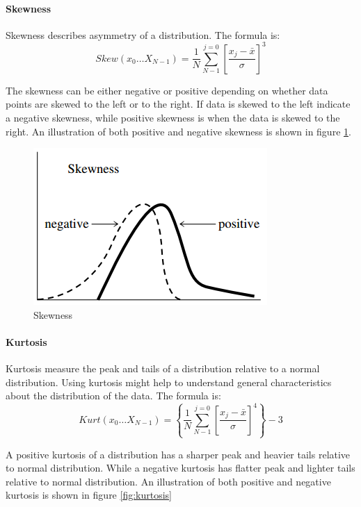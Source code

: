 \documentclass[USenglish]{ifimaster}  %
\begin{document}
\paragraph{Skewness} 
Skewness describes asymmetry of a distribution. The formula is\cite{Press:2007:NRE:1403886}:
	\begin{equation}
	Skew(x_0\dotsc X_{N-1})  =  \frac{1}{N}\sum_{N-1}^{j=0}\left [ \frac{x_j-\bar{x}}{\sigma} \right ]^3
	\label{eq:skew}
	\end{equation}
	
The skewness can be either negative or positive depending on whether data points are skewed to the left or to the right. If data is skewed to the left indicate a negative skewness, while positive skewness is when the data is skewed to the right. An illustration of both positive and negative skewness is shown in figure \ref{fig:skew}.
	
	\begin{figure}[h]
		\centering
		\includegraphics[scale=0.8]{Figures/Skewness}
		\caption{Skewness}
		\label{fig:skew}
	\end{figure}
	
	\FloatBarrier
	
\paragraph{Kurtosis}
Kurtosis measure the peak and tails of a distribution relative to a normal distribution. Using kurtosis might help to understand general characteristics about the distribution of the data. The formula is\cite{Press:2007:NRE:1403886}:
	\begin{equation}
	Kurt(x_0\dotsc X_{N-1}) = \left \{ \frac{1}{N}\sum_{N-1}^{j=0}\left [ \frac{x_j-\bar{x}}{\sigma} \right ]^4 \right \}-3
	\label{eq:kurtosis}
	\end{equation}
	
A positive kurtosis of a distribution has a sharper peak and heavier tails relative to normal distribution. While a negative kurtosis has flatter peak and lighter tails relative to normal distribution. An illustration of both positive and negative kurtosis is shown in figure \ref{fig:kurtosis}
	
\end{document}
